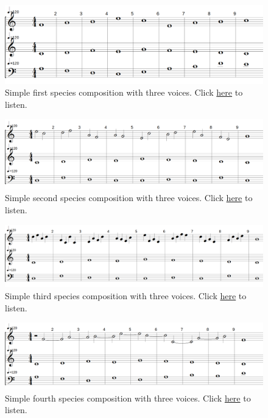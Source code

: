 \begin{figure}[h!]
    \centering
    \includegraphics[width=1\textwidth]{Images/Musicality/simple-test-1sp.png}
    \caption{Simple first species composition with three voices. Click \href{https://youtu.be/qIresNFcmWY}{here} to listen.}
    \label{fig:simple-test-1sp}
\end{figure}
\begin{figure}[h!]
    \centering
    \includegraphics[width=1\textwidth]{Images/Musicality/simple-test-2sp.png}
    \caption{Simple second species composition with three voices. Click \href{https://example.com/}{here} to listen.}
    \label{fig:simple-test-2sp}
\end{figure}
\begin{figure}[h!]
    \centering
    \includegraphics[width=1\textwidth]{Images/Musicality/simple-test-3sp.png}
    \caption{Simple third species composition with three voices. Click \href{https://youtu.be/r6MaQHyTLs8}{here} to listen.}
    \label{fig:simple-test-3sp}
\end{figure}
\begin{figure}[h!]
    \centering
    \includegraphics[width=1\textwidth]{Images/Musicality/simple-test-4sp.png}
    \caption{Simple fourth species composition with three voices. Click \href{https://youtu.be/gcGoXKLcV_I}{here} to listen.}
    \label{fig:simple-test-4sp}
\end{figure}
